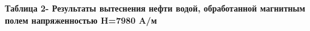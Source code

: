 {{%

{\bfseries Таблица 2- Результаты вытеснения нефти водой, обработанной
магнитным полем напряженностью H=7980 A/м}

}}
